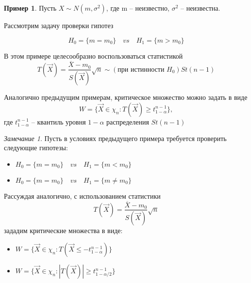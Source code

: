 \documentclass[a4paper, 12pt]{article}
\theoremstyle{definition}
\theoremstyle{leads}
\theoremstyle{example}
\newtheorem{example}{Пример}
\theoremstyle{remark}
\newtheorem{remark}{Замечание}
\begin{document}
\begin{example}
	Пусть $X \sim N(m, \sigma^2)$, где m -- неизвестно, $\sigma^2$ -- неизвестна.
	
	Рассмотрим задачу проверки гипотез
	
	\begin{equation*}
		H_0 = \{m = m_0\} \quad vs \quad H_1  = \{m > m_0\} 
	\end{equation*}
	
	В этом примере целесообразно воспользоваться статистикой 
	\begin{equation*}
		T(\vec{X}) = \frac{\overline{X} - m_0}{S(\vec{X})} \sqrt{n} \sim(\text{при истинности  } H_0) St(n - 1)
	\end{equation*}
	
	Аналогично предыдущим примерам, критическое множество можно задать в виде 
	\begin{equation*}
		W = \{\vec{X} \in \chi_n : T(\vec{X}) \geq t_{1 - \alpha}^{n-1}\},
	\end{equation*}
	где $t_{1 - \alpha}^{n - 1}$ -- квантиль уровня $1 - \alpha$  распределения $St(n - 1)$
	\begin{remark}
		Пусть в условиях предыдущего примера требуется проверить следующие гипотезы:
		
		\begin{itemize}
			\item $H_0 = \{m = m_0\} \quad vs \quad H_1 = \{m < m_0\}$
			\item $H_0 = \{m = m_0\} \quad vs \quad H_1 = \{m \neq m_0\}$
		\end{itemize}
		Рассуждая аналогично, с использованием статистики 
		\begin{equation*}
			T(\vec{X}) = \frac{\overline{X} - m_0}{S(\vec{X})} \sqrt{n}
		\end{equation*}
		 зададим критические множества в виде:
		 \begin{itemize}
		 	\item $W = \{\vec{X} \in \chi_n : T(\vec{X} \leq -t_{1 - \alpha}^{n - 1})\}$
		 	\item $W = \{\vec{X} \in \chi_n : |T(\vec{X})| \geq t_{1 - \alpha/2}^{n - 1}\}$
		 \end{itemize}
	\end{remark}
\end{example}
\end{document}
